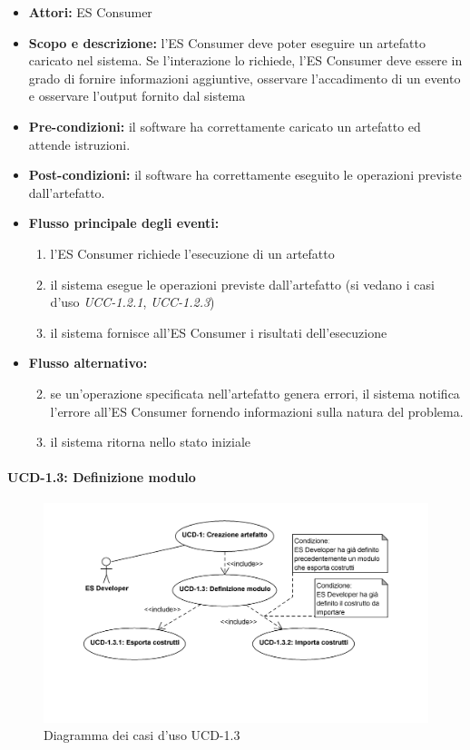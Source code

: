 \begin{itemize}
	\item \textbf{Attori:} ES Consumer
	\item \textbf{Scopo e descrizione:} l'ES Consumer deve poter eseguire un artefatto caricato nel sistema. Se l'interazione lo richiede, l'ES Consumer deve essere in grado di fornire informazioni aggiuntive, osservare l'accadimento di un evento e osservare l'output fornito dal sistema
	\item \textbf{Pre-condizioni:} il software ha correttamente caricato un artefatto ed attende istruzioni.
	\item \textbf{Post-condizioni:} il software ha correttamente eseguito le operazioni previste dall'artefatto.
	\item \textbf{Flusso principale degli eventi:}
		\begin{enumerate}
			\item l'ES Consumer richiede l'esecuzione di un artefatto
			\item il sistema esegue le operazioni previste dall'artefatto (si vedano i casi d'uso \emph{UCC-1.2.1}, \emph{UCC-1.2.3})
			\item il sistema fornisce all'ES Consumer i risultati dell'esecuzione		
		\end{enumerate}
	\item \textbf{Flusso alternativo:} 
		\begin{enumerate}
			\setcounter{enumi}{1}
			\item se un'operazione specificata nell'artefatto genera errori, il sistema notifica l'errore all'ES Consumer fornendo informazioni sulla natura del problema.
			\item il sistema ritorna nello stato iniziale
		\end{enumerate}
\end{itemize}

\paragraph{UCD-1.3: Definizione modulo}

\begin{figure}[h]
\centering
\includegraphics[width=1\textwidth]{Immagini/Capitolo2/UseCases/UCD-1_3.png}
\caption{Diagramma dei casi d'uso UCD-1.3}\label{fig:uc-ucd-1.3}
\end{figure}


